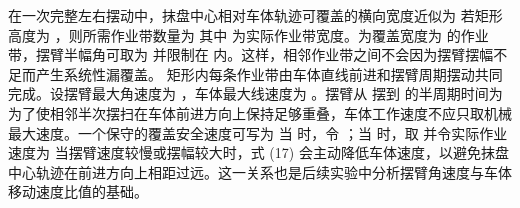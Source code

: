 {}\markdownRendererParagraphSeparator
{}在一次完整左右摆动中，抹盘中心相对车体轨迹可覆盖的横向宽度近似为\markdownRendererParagraphSeparator
{}\markdownRendererParagraphSeparator
{}若矩形高度为 ，则所需作业带数量为\markdownRendererParagraphSeparator
{}\markdownRendererParagraphSeparator
{}其中  为实际作业带宽度。为覆盖宽度为  的作业带，摆臂半幅角可取为\markdownRendererParagraphSeparator
{}\markdownRendererParagraphSeparator
{}并限制在 \markdownRendererInlineMath{[0,\phi_s]} 内。这样，相邻作业带之间不会因为摆臂摆幅不足而产生系统性漏覆盖。\markdownRendererParagraphSeparator
{}
\markdownRendererSectionEnd \markdownRendererSectionBegin
{}\markdownRendererParagraphSeparator
{}矩形内每条作业带由车体直线前进和摆臂周期摆动共同完成。设摆臂最大角速度为 ，车体最大线速度为 。摆臂从  摆到  的半周期时间为\markdownRendererParagraphSeparator
{}\markdownRendererParagraphSeparator
{}为了使相邻半次摆扫在车体前进方向上保持足够重叠，车体工作速度不应只取机械最大速度。一个保守的覆盖安全速度可写为\markdownRendererParagraphSeparator
{}当  时，令 ；当  时，取\markdownRendererParagraphSeparator
{}\markdownRendererParagraphSeparator
{}并令实际作业速度为\markdownRendererParagraphSeparator
{}\markdownRendererParagraphSeparator
{}当摆臂速度较慢或摆幅较大时，式 (17) 会主动降低车体速度，以避免抹盘中心轨迹在前进方向上相距过远。这一关系也是后续实验中分析摆臂角速度与车体移动速度比值的基础。\markdownRendererParagraphSeparator
